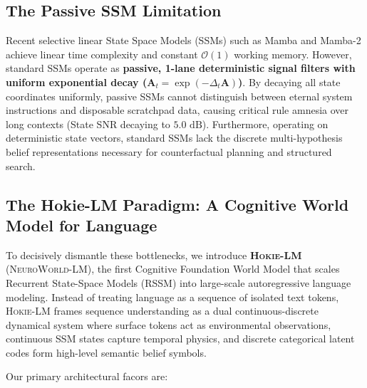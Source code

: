 \subsection{The Passive SSM Limitation}

Recent selective linear State Space Models (SSMs) such as Mamba \citep{gu2023mamba} and Mamba-2 \citep{dao2024transformers} achieve linear time complexity and constant $\mathcal{O}(1)$ working memory. 
However, standard SSMs operate as \textbf{passive, 1-lane deterministic signal filters with uniform exponential decay ($\mathbf{A}_t = \exp(-\Delta_t \mathbf{A})$)}. 
By decaying all state coordinates uniformly, passive SSMs cannot distinguish between eternal system instructions and disposable scratchpad data, causing critical rule amnesia over long contexts (State SNR decaying to $5.0\text{ dB}$). 
Furthermore, operating on deterministic state vectors, standard SSMs lack the discrete multi-hypothesis belief representations necessary for counterfactual planning and structured search.

\subsection{The Hokie-LM Paradigm: A Cognitive World Model for Language}

To decisively dismantle these bottlenecks, we introduce \textbf{\textsc{Hokie-LM}} (\textsc{NeuroWorld-LM}), the first Cognitive Foundation World Model that scales Recurrent State-Space Models (RSSM) into large-scale autoregressive language modeling. 
Instead of treating language as a sequence of isolated text tokens, \textsc{Hokie-LM} frames sequence understanding as a dual continuous-discrete dynamical system where surface tokens act as environmental observations, continuous SSM states capture temporal physics, and discrete categorical latent codes form high-level semantic belief symbols.

Our primary architectural facors are:

